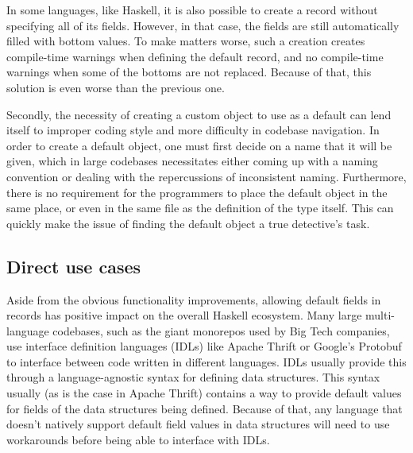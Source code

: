 \documentclass[en]{pracamgr}
\begin{document}
In some languages, like Haskell, it is also possible to create a record without specifying all of its fields.
However, in that case, the fields are still automatically filled with bottom values.
To make matters worse, such a creation creates compile-time warnings when defining the default record, and no compile-time warnings when some of the bottoms are not replaced.
Because of that, this solution is even worse than the previous one.

Secondly, the necessity of creating a custom object to use as a default can lend itself to improper coding style and more difficulty in codebase navigation.
In order to create a default object, one must first decide on a name that it will be given, which in large codebases necessitates either coming up with a naming convention or dealing with the repercussions of inconsistent naming. 
Furthermore, there is no requirement for the programmers to place the default object in the same place, or even in the same file as the definition of the type itself.
This can quickly make the issue of finding the default object a true detective's task. 

\subsection{Direct use cases}
Aside from the obvious functionality improvements, allowing default fields in records has positive impact on the overall Haskell ecosystem.
Many large multi-language codebases, such as the giant monorepos used by Big Tech companies, use interface definition languages
(IDLs) like Apache Thrift or Google's Protobuf to interface between code written in different languages.
IDLs usually provide this through a language-agnostic syntax for defining data structures. 
This syntax usually (as is the case in Apache Thrift) contains a way to provide default values for fields of the data structures being defined.
Because of that, any language that doesn't natively support default field values in data structures will need to use workarounds before being able to interface with IDLs.
\end{document}
